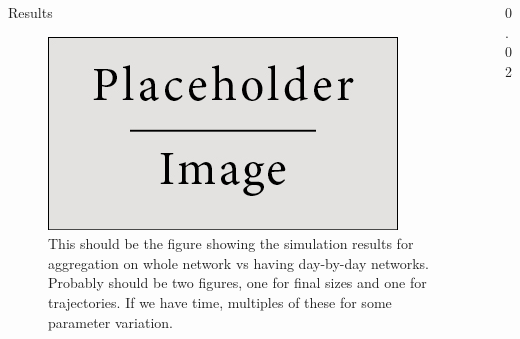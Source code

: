 \documentclass[final]{beamer} %
\newcommand{\spaceProp}{0.02}
\newcommand{\spacer}{\begin{column}{\spaceProp\paperwidth}\end{column}}
\newenvironment{threeCol}{\begin{column}[t]{0.715\paperwidth}}{\end{column}}
\begin{document}
\begin{frame}{}
\begin{columns}[t]
\begin{threeCol}
\begin{block}{Results}
\begin{figure}
    \end{figure}
    \begin{figure}
    \includegraphics[width=0.8\linewidth]{placeholder.jpg}
    \caption{This should be the figure showing the simulation results for aggregation on whole network vs having day-by-day networks.  Probably should be two figures, one for final sizes and one for trajectories.  If we have time, multiples of these for some parameter variation.}
    \end{figure}
    
    \end{block}
    \vfill
    \end{threeCol}
    \spacer{}
    \end{columns}
  \end{frame}
  
\end{document}
